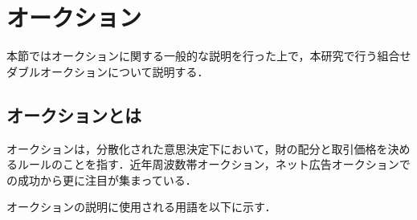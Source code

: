 \hypertarget{ux30aaux30fcux30afux30b7ux30e7ux30f3}{%
\section{オークション}\label{ux30aaux30fcux30afux30b7ux30e7ux30f3}}

本節ではオークションに関する一般的な説明を行った上で，本研究で行う組合せダブルオークションについて説明する．

\hypertarget{ux30aaux30fcux30afux30b7ux30e7ux30f3ux3068ux306f}{%
\subsection{オークションとは}\label{ux30aaux30fcux30afux30b7ux30e7ux30f3ux3068ux306f}}

オークションは，分散化された意思決定下において，財の配分と取引価格を決めるルールのことを指す．近年周波数帯オークション，ネット広告オークションでの成功から更に注目が集まっている．

オークションの説明に使用される用語を以下に示す．

